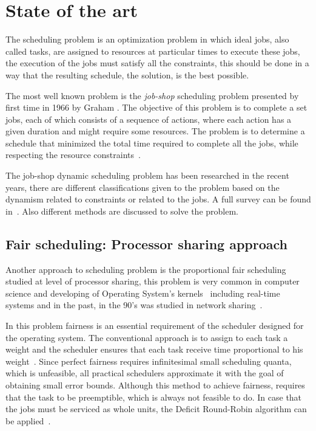 \chapter{State of the art}

The scheduling problem is an optimization problem in which ideal jobs, also called tasks, are assigned to resources at particular times to execute these jobs, the execution of the jobs must satisfy all the constraints, this should be done in a way that the resulting schedule, the solution, is the best possible.

The most well known problem is the \textit{job-shop} scheduling problem presented by first time in 1966 by Graham \cite{graham66}. The objective of this problem is to complete a set jobs, each of which consists of a sequence of actions, where each action has a given duration and might require some resources. The problem is to determine a schedule that minimized the total time required to complete all the jobs, while respecting the resource constraints~\cite{russell03}.

The job-shop dynamic scheduling problem has been researched in the recent years, there are different classifications given to the problem based on the dynamism related to constraints or related to the jobs. A full survey can be found in~\cite{ouelhadj}. Also different methods are discussed to solve the problem.

\section{Fair scheduling: Processor sharing approach}

Another approach to scheduling problem is the proportional fair scheduling studied at level of processor sharing, this problem is very common in computer science and developing of Operating System's kernels~\cite{li09} including real-time systems and in the past, in the 90's was studied in network sharing~\cite{parekh93}. 

In this problem fairness is an essential requirement of the scheduler designed for the operating system. The conventional approach is to assign to each task a weight and the scheduler ensures that each task receive time proportional to his weight~\cite{katevenis91, parekh93}. Since perfect fairness requires infinitesimal small scheduling quanta, which is unfeasible, all practical schedulers approximate it with the goal of obtaining small error bounds. Although this method to achieve fairness, requires that the task to be preemptible, which is always not feasible to do. In case that the jobs must be serviced as whole units, the Deficit Round-Robin algorithm can be applied~\cite{shreedhar96}. 

